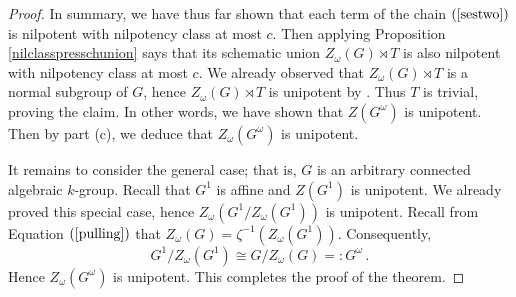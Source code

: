 \documentclass[twoside,a4paper,reqno,11pt]{amsart}
\theoremstyle{definition}
\begin{document}
\begin{proof}
\vspace{2mm}\noindent In summary, we have thus far shown that each term of the chain $(\ref{sestwo})$ is nilpotent with nilpotency class at most $c$. Then applying Proposition \ref{nilclasspresschunion} says that its schematic union $Z_\omega(G)\rtimes T$ is also nilpotent with nilpotency class at most $c$. We already observed that $Z_\omega(G)\rtimes T$ is a normal subgroup of $G$, hence $Z_\omega(G)\rtimes T$ is unipotent by \cite[IV, \S4, Cor.\ 1.13]{DG}. Thus $T$ is trivial, proving the claim. In other words, we have shown that $Z(G^\omega)$ is unipotent. Then by part (c), we deduce that $Z_{\omega}(G^\omega)$ is unipotent.

\vspace{2mm}\noindent It remains to consider the general case; that is, $G$ is an arbitrary connected algebraic $k$-group. Recall that $G^1$ is affine and $Z(G^1)$ is unipotent. We already proved this special case, hence $Z_{\omega}(G^1/Z_{\omega}(G^1))$ is unipotent. Recall from Equation $(\ref{pulling})$ that $Z_\omega(G)=\zeta^{-1}(Z_{\omega}(G^1))$. Consequently, $$G^1/Z_{\omega}(G^1)\cong G/Z_\omega(G)=:G^\omega\,.$$ %
Hence $Z_{\omega}(G^\omega)$ is unipotent. This completes the proof of the theorem.
\end{proof}
\end{document}
